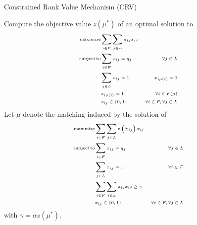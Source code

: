 \begin{algorithm}
    \caption{Constrained Rank Value Mechanism (CRV)}\label{alg:crv}
    \KwResult{\(\mu\)}
    Compute the objective value \( z \left( \mu ^ { * } \right) \) of an optimal solution to
    \[\tiny
        \begin{aligned}
            \operatorname{maximize} & \sum_{i \in F} \sum_{j \in L} \pi_{i j} x_{i j} \\
            \operatorname {subject}\operatorname{to} & \sum_{i \in F} x_{i j}=q_{j} & \forall j \in L \\
            & \sum_{j \in L} x_{i j}=1 & x_{i \mu(i)}=1 \\
            & x_{i\mu (i)} = 1 &  \forall i \in F(\mu) \\
            & x_{i j} \in\{0,1\} & \forall i \in F, \forall j \in L
        \end{aligned}
    \]%
    Let \( \mu \) denote the matching induced by the solution of
    \[\tiny
        \begin{aligned}
            \operatorname{maximize} & \sum_{i \in F} \sum_{j \in L} v\left(\succeq_{i j}\right) x_{i j} \\
            \operatorname {subject}\operatorname{to} & \sum_{i \in F} x_{i j}=q_{j} & \forall j \in L \\
            & \sum_{j \in L} x_{i j}=1 & \forall i \in F \\
            & \sum_{i \in F} \sum_{j \in L} \pi_{i j} x_{i j} \geq \gamma \\
            & x_{i j} \in\{0,1\} & \forall i \in F, \forall j \in L
        \end{aligned}
    \]%
    with \( \gamma = \alpha z \left( \mu ^ { * } \right) \).
\end{algorithm}


